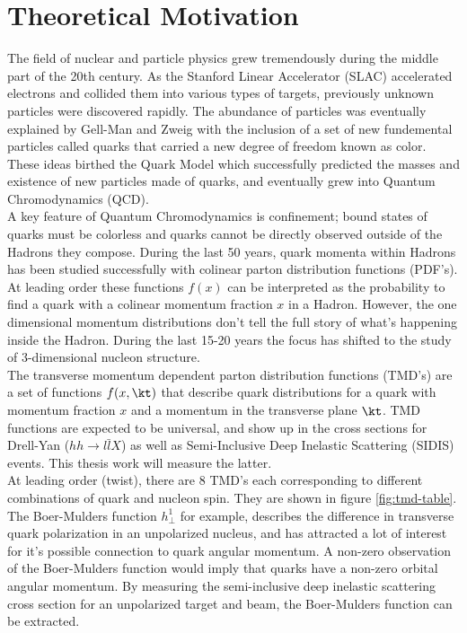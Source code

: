 \section{Theoretical Motivation}

The field of nuclear and particle physics grew tremendously during the middle part of the 20th century.  As the Stanford Linear Accelerator (SLAC) accelerated electrons and collided them into various types of targets, previously unknown particles were discovered rapidly.  The abundance of particles was eventually explained by Gell-Man and Zweig with the inclusion of a set of new fundemental particles called quarks that carried a new degree of freedom known as color.  These ideas birthed the Quark Model which successfully predicted the masses and existence of new particles made of quarks, and eventually grew into Quantum Chromodynamics (QCD).  \\

A key feature of Quantum Chromodynamics is confinement; bound states of quarks must be colorless and quarks cannot be directly observed outside of the Hadrons they compose.  During the last 50 years, quark momenta within Hadrons has been studied successfully with colinear parton distribution functions (PDF's).  At leading order these functions $f(x)$ can be interpreted as the probability to find a quark with a colinear momentum fraction $x$ in a Hadron.  However, the one dimensional momentum distributions don't tell the full story of what's happening inside the Hadron.  During the last 15-20 years the focus has shifted to the study of 3-dimensional nucleon structure. \\

The transverse momentum dependent parton distribution functions (TMD's) are a set of functions $f(x,\kt)$ that describe quark distributions for a quark with momentum fraction $x$ and a momentum in the transverse plane $\kt$.  TMD functions are expected to be universal, and show up in the cross sections for Drell-Yan ($hh \rightarrow l \bar{l}X$) as well as Semi-Inclusive Deep Inelastic Scattering (SIDIS) events.  This thesis work will measure the latter.  \\

At leading order (twist), there are 8 TMD's each corresponding to different combinations of quark and nucleon spin.  They are shown in figure \ref{fig:tmd-table}.  The Boer-Mulders function $h^{1}_{\perp}$ for example, describes the difference in transverse quark polarization in an unpolarized nucleus, and has attracted a lot of interest for it's possible connection to quark angular momentum.  A non-zero observation of the Boer-Mulders function would imply that quarks have a non-zero orbital angular momentum.  By measuring the semi-inclusive deep inelastic scattering cross section for an unpolarized target and beam, the Boer-Mulders function can be extracted.

